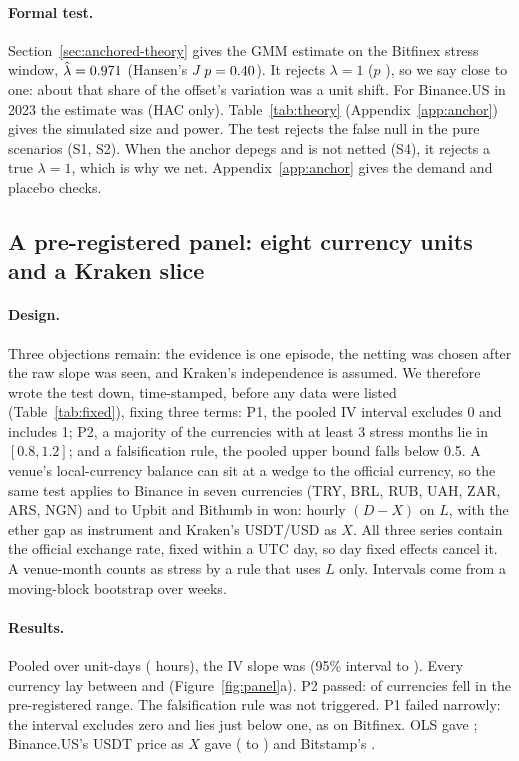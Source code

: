 \documentclass[sigconf,review,anonymous]{acmart}
\begin{document}
\paragraph{Formal test.} Section~\ref{sec:anchored-theory} gives the GMM estimate on the Bitfinex stress window,
$\hat\lambda=0.971{}$ (Hansen's $J$ $p=0.40{}$). It rejects $\lambda=1$ ($p$
\NumGBfxPrimaryPOne{}), so we say close to one: about that share of the offset's variation was a unit shift. For
Binance.US in 2023 the estimate was \NumGBusUsdtLam{} (HAC only). Table~\ref{tab:theory} (Appendix~\ref{app:anchor}) gives the simulated size and
power. The test rejects the false null in the pure scenarios (S1, S2). When the anchor depegs and is not netted (S4), it
rejects a true $\lambda=1$, which is why we net.
Appendix~\ref{app:anchor} gives the demand and placebo checks.

\subsection{A pre-registered panel: eight currency units and a Kraken slice}
\label{sec:panel}
\paragraph{Design.} Three objections remain: the evidence is one episode, the netting was chosen after the raw slope was seen,
and Kraken's independence is assumed. We therefore wrote the test down, time-stamped, before any data were listed
(Table~\ref{tab:fixed}), fixing three terms: P1, the pooled IV interval excludes 0 and includes 1; P2, a majority of the
currencies with at least 3 stress months lie in $[0.8, 1.2]$; and a falsification rule, the pooled upper bound falls below 0.5.
A venue's local-currency balance can sit at a wedge to the official currency, so the same
test applies to Binance in seven currencies (TRY, BRL, RUB, UAH, ZAR, ARS, NGN) and to Upbit and Bithumb in won: hourly $(D-X)$ on $L$, with the ether gap as instrument and Kraken's USDT/USD as $X$. All three
series contain the official exchange rate, fixed within a UTC day, so day fixed effects cancel it. A venue-month counts as stress by a rule that uses $L$ only. Intervals come from a moving-block bootstrap
over weeks.

\paragraph{Results.} Pooled over \NumPNPooledStressDays{} unit-days (\NumPNPooledStressHours{} hours), the IV slope was
\NumPNPooledStressLam{} (95\% interval \NumPNPooledStressLo{} to \NumPNPooledStressHi{}). Every currency lay between
\NumPNRangeMin{} and \NumPNRangeMax{} (Figure~\ref{fig:panel}a). P2 passed: \NumPNPTwoInside{} of \NumPNPTwoEligible{}
currencies fell in the pre-registered range. The falsification rule was not triggered. P1 failed narrowly: the interval excludes
zero and lies just below one, as on Bitfinex. OLS gave \NumPNRobOlsPooled{}; Binance.US's USDT price as $X$ gave
\NumPNAltBusLam{} (\NumPNAltBusLo{} to \NumPNAltBusHi{}) and Bitstamp's \NumPNAltBstLam{}.
\end{document}
